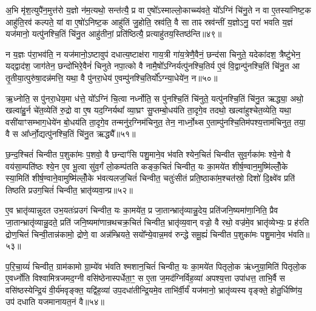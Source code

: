 अ॒भि मृ॑श॒त्युपै॑न॒मुत्त॑रो य॒ज्ञो न॑म॒त्यथो॒ सन्त॑त्यै॒ प्र वा ए॒षो᳚\-ऽस्माल्लो॒काच्च्य॑वते॒ यो᳚\-ऽग्निं चि॑नु॒ते न वा ए॒तस्या॑निष्ट॒क आहु॑ति॒रव॑ कल्पते॒ यां वा ए॒षो॑\-ऽनिष्ट॒क आहु॑तिं जु॒होति॒ स्रव॑ति॒ वै सा ताꣴ स्रव॑न्तीं य॒ज्ञो\-ऽनु॒ परा॑ भवति य॒ज्ञं यज॑मानो॒ यत्पु॑नश्चि॒तिं चि॑नु॒त आहु॑तीनां॒ प्रति॑ष्ठित्यै॒ प्रत्याहु॑तय॒स्तिष्ठ॑न्ति॥४९॥

न य॒ज्ञः प॑रा॒भव॑ति॒ न यज॑मानो॒\-ऽष्टावुप॑ दधात्य॒ष्टाक्ष॑रा गाय॒त्री गा॑य॒त्रेणै॒वैनं॒ छन्द॑सा चिनुते॒ यदेका॑दश॒ त्रैष्टु॑भेन॒ यद्द्वाद॑श॒ जाग॑तेन॒ छन्दो॑भिरे॒वैनं॑ चिनुते नपा॒त्को वै नामै॒षो᳚\-ऽग्निर्यत्पु॑नश्चि॒तिर्य ए॒वं वि॒द्वान्पु॑नश्चि॒तिं चि॑नु॒त आ तृ॒तीया॒त्पुरु॑षा॒दन्न॑मत्ति॒ यथा॒ वै पु॑नरा॒धेय॑ ए॒वम्पु॑नश्चि॒तिर्यो᳚\-ऽग्न्या॒धेये॑न॒ न॥५०॥

ऋ॒ध्नोति॒ स पु॑नरा॒धेय॒मा ध॑त्ते॒ यो᳚\-ऽग्निं चि॒त्वा नर्ध्नोति॒ स पु॑नश्चि॒तिं चि॑नुते॒ यत्पु॑नश्चि॒तिं चि॑नु॒त ऋद्ध्या॒ अथो॒ खल्वा॑हु॒र्न चे॑त॒व्येति॑ रु॒द्रो वा ए॒ष यद॒ग्निर्यथा᳚ व्या॒घ्रꣳ सु॒प्तम्बो॒धय॑ति ता॒दृगे॒व तदथो॒ खल्वा॑हुश्चेत॒व्येति॒ यथा॒ वसी॑याꣳसम्भाग॒धेये॑न बो॒धय॑ति ता॒दृगे॒व तन्मनु॑र॒ग्निम॑चिनुत॒ तेन॒ नार्ध्नो॒थ्स ए॒ताम्पु॑नश्चि॒तिम॑पश्य॒त्ताम॑चिनुत॒ तया॒ वै स आ᳚र्ध्नो॒द्यत्पु॑नश्चि॒तिं चि॑नु॒त ऋद्ध्यै᳚॥५१॥

{\anuvakamend[{त्रि॒वृदथ॒ तिष्ठ॑न्त्यग्न्या॒धेये॑न॒ नाचि॑नुत स॒प्तद॑श च॥10॥}]}

छ॒न्द॒श्चितं॑ चिन्वीत प॒शुका॑मः प॒शवो॒ वै छन्दाꣳ॑सि पशु॒माने॒व भ॑वति श्येन॒चितं॑ चिन्वीत सुव॒र्गका॑मः श्ये॒नो वै वय॑सा॒म्पति॑ष्ठः श्ये॒न ए॒व भू॒त्वा सु॑व॒र्गं लो॒कम्प॑तति कङ्क॒चितं॑ चिन्वीत॒ यः का॒मये॑त शीर्\mbox{}ष॒ण्वान॒मुष्मि॑ल्लोँ॒के स्या॒मिति॑ शीर्\mbox{}ष॒ण्वाने॒वामुष्मि॑ल्लोँ॒के भ॑वत्यलज॒चितं॑ चिन्वीत॒ चतुः॑सीतं प्रति॒ष्ठाका॑म॒श्चत॑स्रो॒ दिशो॑ दि॒क्ष्वे॑व प्रति॑ तिष्ठति प्रउग॒चितं॑ चिन्वीत॒ भ्रातृ॑व्यवा॒न्प्र॥५२॥

ए॒व भ्रातृ॑व्यान्नुदत उभ॒यतः॑प्रउगं चिन्वीत॒ यः का॒मये॑त॒ प्र जा॒तान्भ्रातृ॑व्यान्नु॒देय॒ प्रति॑जनि॒ष्यमा॑णा॒निति॒ प्रैव जा॒तान्भ्रातृ॑व्यान्नु॒दते॒ प्रति॑ जनि॒ष्यमा॑णान्रथचक्र॒चितं॑ चिन्वीत॒ भ्रातृ॑व्य॒वान् वज्रो॒ वै रथो॒ वज्र॑मे॒व भ्रातृ॑व्येभ्यः॒ प्र ह॑रति द्रोण॒चितं॑ चिन्वी॒तान्न॑कामो॒ द्रोणे॒ वा अन्न॑म्भ्रियते॒ सयो᳚न्ये॒वान्न॒मव॑ रुन्द्धे समू॒ह्यं॑ चिन्वीत प॒शुका॑मः पशु॒माने॒व भ॑वति॥५३॥

प॒रि॒चा॒य्यं॑ चिन्वीत॒ ग्राम॑कामो ग्रा॒म्ये॑व भ॑वति श्मशान॒चितं॑ चिन्वीत॒ यः का॒मये॑त पितृलो॒क ऋ॑ध्नुया॒मिति॑ पितृलो॒क ए॒वर्ध्नो॑ति विश्वामित्रजमद॒ग्नी वसि॑ष्ठेनास्पर्धेता॒ꣳ॒ स ए॒ता ज॒मद॑ग्निर्विह॒व्या॑ अपश्य॒त्ता उपा॑धत्त॒ ताभि॒र्वै स वसि॑ष्ठस्येन्द्रि॒यं वी॒र्य॑मवृङ्क्त॒ यद्वि॑ह॒व्या॑ उप॒दधा॑तीन्द्रि॒यमे॒व ताभि॑र्वी॒र्यं॑ यज॑मानो॒ भ्रातृ॑व्यस्य वृङ्क्ते॒ होतु॒र्धिष्णि॑य॒ उप॑ दधाति यजमानायत॒नं वै॥५४॥

